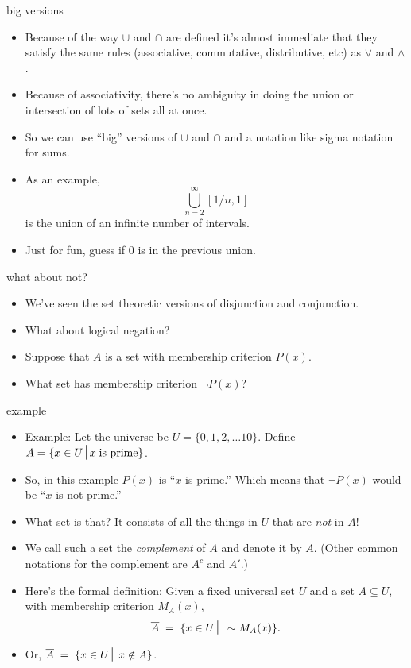 \documentclass[handout,landscape]{beamer}
\begin{document}
\begin{frame}{big versions}
\begin{itemize}
\item Because of the way $\cup$ and $\cap$ are defined it's almost immediate that they satisfy the same rules (associative, commutative, distributive, etc) as $\lor$ and $\land$. \pause
\item Because of associativity, there's no ambiguity in doing the union or intersection of lots of sets all at once. \pause
\item So we can use ``big'' versions of $\cup$ and $\cap$ and a notation like sigma notation for sums. \pause
\item As an example, \newline
\[ \bigcup_{n=2}^{\infty} [1/n, 1] \] \pause
is the union of an infinite number of intervals. \pause
\item Just for fun, guess if $0$ is in the previous union.
\end{itemize}
\end{frame}

\begin{frame}{what about not?}
\begin{itemize}
\item We've seen the set theoretic versions of disjunction and conjunction. \pause
\item What about logical negation? \pause
\item Suppose that $A$ is a set with membership criterion $P(x)$. \pause 
\item What set has membership criterion $\lnot P(x)$? \pause 
\end{itemize}
\end{frame}

\begin{frame}{example}
\begin{itemize}
\item Example: Let the universe be $U = \{0,1,2, \ldots 10 \}$.  Define $A = \{x \in U \suchthat x \; \mbox{is prime} \}$. \pause
\item So, in this example $P(x)$ is ``$x$ is prime.'' \pause \newline
Which means that $\lnot P(x)$ would be ``$x$ is not prime.'' \pause
\item What set is that? \pause It consists of all the things in $U$ that are {\em not} in $A$! \pause
\item We call such a set the {\em complement} of $A$ and denote it by $\overline{A}$. \pause \newline
(Other common notations for the complement are $A^c$ and $A'$.) \pause
\item Here's the formal definition: \pause \newline
Given a fixed universal set $U$ and a set $A \subseteq U$, with membership criterion $M_A(x)$, \pause
\[ \overline{A} \; = \; \{ x \in U \suchthat\; \lnot M_A(x) \}. \] \pause
\item Or, \hspace{.3in} $\displaystyle \overline{A} \; = \; \{ x \in U \suchthat\; x \notin A \}$.
\end{itemize}
\end{frame}
\end{document}
